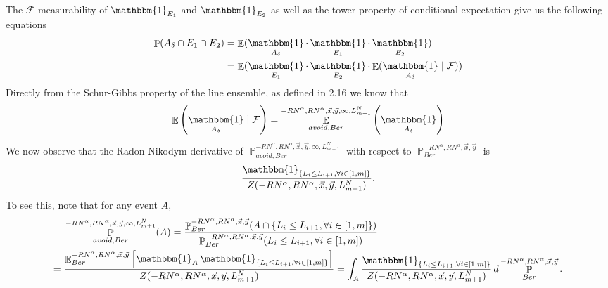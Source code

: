 \documentclass[12pt]{article}
\DeclareMathOperator{\ex}{\mathbb{E}}
\DeclareMathOperator{\pr}{\mathbb{P}}
\DeclareMathOperator{\indic}{\mathbbm{1}}
\begin{document}
The $\mathcal{F}$-measurability of $\indic_{E_1}$ and $\indic_{E_2}$ as well as the tower property of conditional expectation give us the following equations
\begin{align*}
\pr(A_\delta\cap E_1\cap E_2)&=\ex(\indic_{A_\delta}\cdot \indic_{E_1}\cdot \indic_{E_2})\\
&=\ex(\indic_{E_1}\cdot \indic_{E_2}\cdot\ex(\indic_{A_\delta}\mid \mathcal{F}))
\end{align*}
Directly from the Schur-Gibbs property of the line ensemble, as defined in 2.16 we know that 
\[\ex\left(\indic_{A_\delta}\mid \mathcal{F}\right)=\ex_{avoid,Ber}^{-RN^\alpha,RN^\alpha,\vec x, \vec y, \infty, L_{m+1}^N}\left(\indic_{A_\delta}\right)
\]
We now observe that the Radon-Nikodym derivative of $\pr_{avoid,Ber}^{-RN^\alpha,RN^\alpha,\vec x, \vec y, \infty, L_{m+1}^N}$ with respect to $\pr_{Ber}^{-RN^\alpha, RN^\alpha,\vec x,\vec y}$ is $$\frac{\indic_{\left\{L_i\leq L_{i+1},\forall i\in [1,m]\right\}}}{Z(-RN^\alpha,RN^\alpha,\vec x, \vec y, L_{m+1}^N)}.$$ To see this, note that for any event $A$,
\begin{align*}
&\pr_{avoid,Ber}^{-RN^\alpha,RN^\alpha,\vec x, \vec y, \infty, L_{m+1}^N}(A) = \frac{\pr_{Ber}^{-RN^\alpha,RN^\alpha,\vec x, \vec y}(A\cap\left\{L_i\leq L_{i+1},\forall i\in [1,m]\right\})}{\pr_{Ber}^{-RN^\alpha,RN^\alpha,\vec x, \vec y}(L_i\leq L_{i+1},\forall i\in [1,m])}\\
= \; & \frac{\ex_{Ber}^{-RN^\alpha,RN^\alpha,\vec x, \vec y}\left[\indic_A \indic_{\left\{L_i\leq L_{i+1},\forall i\in [1,m]\right\}}\right]}{Z(-RN^\alpha,RN^\alpha,\vec{x},\vec{y},L^N_{m+1})} = \int_A \frac{\indic_{\left\{L_i\leq L_{i+1},\forall i\in [1,m]\right\}}}{Z(-RN^\alpha,RN^\alpha,\vec x, \vec y, L_{m+1}^N)}\,d\pr_{Ber}^{-RN^\alpha,RN^\alpha,\vec x, \vec y}.
\end{align*}
\end{document}
